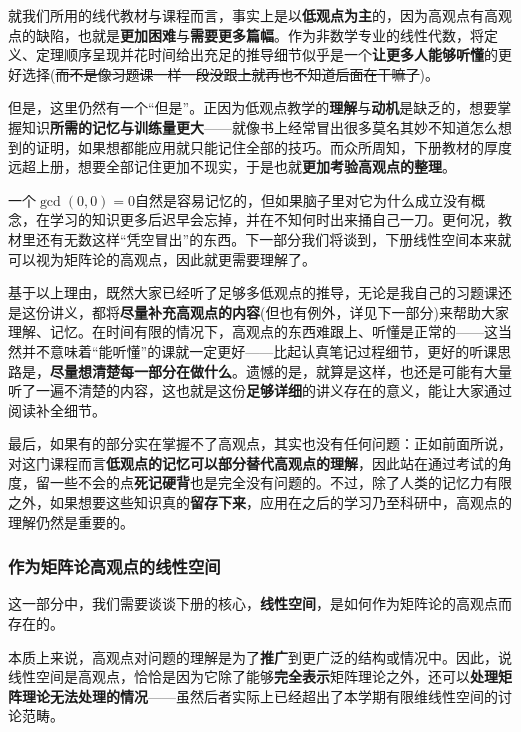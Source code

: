\documentclass[a4paper,UTF8,fontset=windows,AutoFakeBold]{ctexart}
\begin{document}
就我们所用的线代教材与课程而言，事实上是以\textbf{低观点为主}的，因为高观点有高观点的缺陷，也就是\textbf{更加困难}与\textbf{需要更多篇幅}。作为非数学专业的线性代数，将定义、定理顺序呈现并花时间给出充足的推导细节似乎是一个\textbf{让更多人能够听懂}的更好选择(\sout{而不是像习题课一样一段没跟上就再也不知道后面在干嘛了})。

但是，这里仍然有一个``但是''。正因为低观点教学的\textbf{理解}与\textbf{动机}是缺乏的，想要掌握知识\textbf{所需的记忆与训练量更大}——就像书上经常冒出很多莫名其妙不知道怎么想到的证明，如果想都能应用就只能记住全部的技巧。而众所周知，下册教材的厚度远超上册，想要全部记住更加不现实，于是也就\textbf{更加考验高观点的整理}。

一个$\gcd(0,0)=0$自然是容易记忆的，但如果脑子里对它为什么成立没有概念，在学习的知识更多后迟早会忘掉，并在不知何时出来捅自己一刀。更何况，教材里还有无数这样``凭空冒出''的东西。下一部分我们将谈到，下册线性空间本来就可以视为矩阵论的高观点，因此就更需要理解了。

基于以上理由，既然大家已经听了足够多低观点的推导，无论是我自己的习题课还是这份讲义，都将\textbf{尽量补充高观点的内容}(但也有例外，详见下一部分)来帮助大家理解、记忆。在时间有限的情况下，高观点的东西难跟上、听懂是正常的——这当然并不意味着``能听懂''的课就一定更好——比起认真笔记过程细节，更好的听课思路是，\textbf{尽量想清楚每一部分在做什么}。遗憾的是，就算是这样，也还是可能有大量听了一遍不清楚的内容，这也就是这份\textbf{足够详细}的讲义存在的意义，能让大家通过阅读补全细节。

最后，如果有的部分实在掌握不了高观点，其实也没有任何问题：正如前面所说，对这门课程而言\textbf{低观点的记忆可以部分替代高观点的理解}，因此站在通过考试的角度，留一些不会的点\textbf{死记硬背}也是完全没有问题的。不过，除了人类的记忆力有限之外，如果想要这些知识真的\textbf{留存下来}，应用在之后的学习乃至科研中，高观点的理解仍然是重要的。

\subsubsection{作为矩阵论高观点的线性空间}
这一部分中，我们需要谈谈下册的核心，\textbf{线性空间}，是如何作为矩阵论的高观点而存在的。

本质上来说，高观点对问题的理解是为了\textbf{推广}到更广泛的结构或情况中。因此，说线性空间是高观点，恰恰是因为它除了能够\textbf{完全表示}矩阵理论之外，还可以\textbf{处理矩阵理论无法处理的情况}——虽然后者实际上已经超出了本学期有限维线性空间的讨论范畴。
\end{document}
